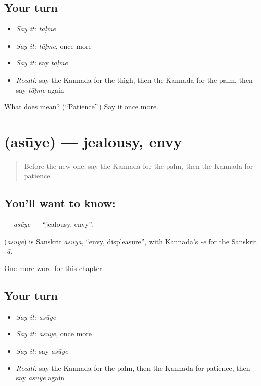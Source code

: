 \subsection*{Your turn}
\begin{itemize}
\raggedright
  \item \emph{Say it:} \emph{tāḷme}
  \item \emph{Say it:} \emph{tāḷme}, once more
  \item \emph{Say it:} say \emph{tāḷme}
  \item \emph{Recall:} say the Kannada for the thigh, then the Kannada for the palm, then say \emph{tāḷme} again
\end{itemize}

\begin{tcolorbox}[breakable,colback=teal!4,colframe=teal!35!black,title={Before you move on}]
What does  mean? (\textquotedblleft{}Patience\textquotedblright{}.) Say it once more.
\end{tcolorbox}
\section[\texorpdfstring{\kn{ಅಸೂಯೆ} (asūye)}{ಅಸೂಯೆ (asūye)}]{ (asūye) — jealousy, envy}

\label{lesson:KA-C169-asuye}



\begin{quote}
Before the new one: say the Kannada for the palm, then the Kannada for patience.
\end{quote}

\subsection*{You'll want to know: }
\textbf{} — \emph{asūye} — \textquotedblleft{}jealousy, envy\textquotedblright{}.

\begin{cousinweb}
\textbf{} (\emph{asūye}) is Sanskrit \emph{asūyā}, \textquotedblleft{}envy, displeasure\textquotedblright{}, with Kannada's \emph{-e} for the Sanskrit \emph{-ā}.
\end{cousinweb}

\begin{grammarlens}[title={What you've built}]
One more word for this chapter.
\end{grammarlens}

\subsection*{Your turn}
\begin{itemize}
\raggedright
  \item \emph{Say it:} \emph{asūye}
  \item \emph{Say it:} \emph{asūye}, once more
  \item \emph{Say it:} say \emph{asūye}
  \item \emph{Recall:} say the Kannada for the palm, then the Kannada for patience, then say \emph{asūye} again
\end{itemize}

